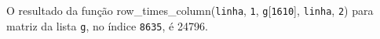 \documentclass[12pt,varwidth=16cm,border=1pt]{standalone}
\begin{document}
O resultado da função row\_times\_column(\verb+linha+, \verb+1+, \verb+g+[\verb+1610+], \verb+linha+, \verb+2+) para matriz da lista \verb+g+, no índice \verb+8635+, é 24796.

\questiomtrue
\end{document}
